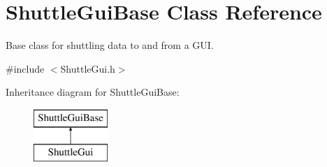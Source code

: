 \hypertarget{class_shuttle_gui_base}{}\section{Shuttle\+Gui\+Base Class Reference}
\label{class_shuttle_gui_base}


Base class for shuttling data to and from a G\+UI.  




{\ttfamily \#include $<$Shuttle\+Gui.\+h$>$}

Inheritance diagram for Shuttle\+Gui\+Base\+:\begin{figure}[H]
\begin{center}
\leavevmode
\includegraphics[height=2.000000cm]{class_shuttle_gui_base}
\end{center}
\end{figure}
